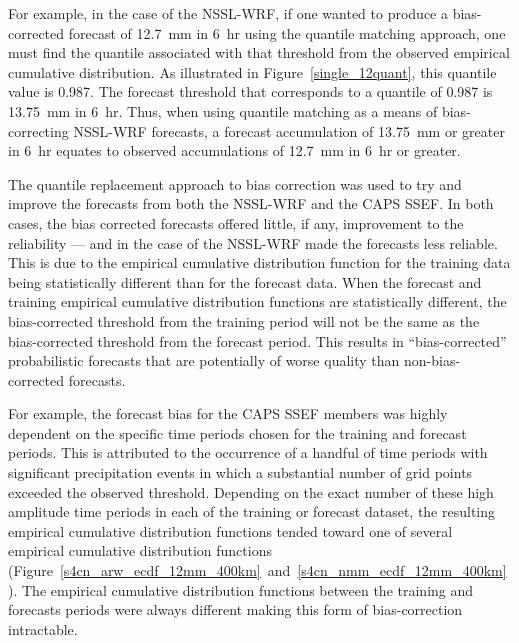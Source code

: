 For example, in the case of the NSSL-WRF, if one wanted to produce a bias-corrected forecast of \mbox{12.7 mm} in \mbox{6 hr} using the quantile matching approach, one must find the quantile associated with that threshold from the observed empirical cumulative distribution.
As illustrated in \mbox{Figure \ref{single_12quant}}, this quantile value is 0.987.
The forecast threshold that corresponds to a quantile of 0.987 is \mbox{13.75 mm} in \mbox{6 hr}.
Thus, when using quantile matching as a means of bias-correcting NSSL-WRF forecasts, a forecast accumulation of \mbox{13.75 mm} or greater in \mbox{6 hr} equates to observed accumulations of \mbox{12.7 mm} in \mbox{6 hr} or greater.


The quantile replacement approach to bias correction was used to try and improve the forecasts from both the NSSL-WRF and the CAPS SSEF.
In both cases, the bias corrected forecasts offered little, if any, improvement to the reliability --- and in the case of the NSSL-WRF made the forecasts less reliable.
This is due to the empirical cumulative distribution function for the training data being statistically different than for the forecast data.
When the forecast and training empirical cumulative distribution functions are statistically different, the bias-corrected threshold from the training period will not be the same as the bias-corrected threshold from the forecast period.
This results in ``bias-corrected'' probabilistic forecasts that are potentially of worse quality than non-bias-corrected forecasts.


For example, the forecast bias for the CAPS SSEF members was highly dependent on the specific time periods chosen for the training and forecast periods.
This is attributed to the occurrence of a handful of time periods with significant precipitation events in which a substantial number of grid points exceeded the observed threshold.
Depending on the exact number of these high amplitude time periods in each of the training or forecast dataset, the resulting empirical cumulative distribution functions tended toward one of several empirical cumulative distribution functions (\mbox{Figure \ref{s4cn_arw_ecdf_12mm_400km} and \ref{s4cn_nmm_ecdf_12mm_400km}}).
The empirical cumulative distribution functions between the training and forecasts periods were always different making this form of bias-correction intractable.


